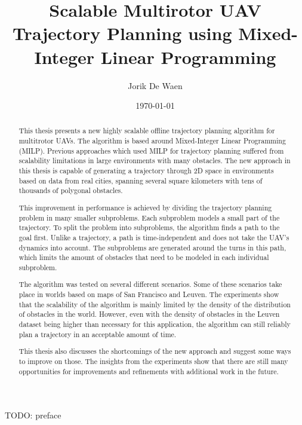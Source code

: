 \documentclass[
master=cws,
masteroption=ai,
english,
]{kulemt}
\title{Scalable Multirotor UAV Trajectory Planning using Mixed-Integer Linear Programming}
\author{Jorik De Waen}
\date{\today}
\begin{document}
\begin{preface}
TODO: preface
\end{preface}

\tableofcontents*

\begin{abstract}
This thesis presents a new highly scalable offline trajectory planning algorithm for multitrotor UAVs. The algorithm is based around Mixed-Integer Linear Programming (MILP). Previous approaches which used MILP for trajectory planning suffered from scalability limitations in large environments with many obstacles. The new approach in this thesis is capable of generating a trajectory through 2D space in environments based on data from real cities, spanning several square kilometers with tens of thousands of polygonal obstacles.
\par
This improvement in performance is achieved by dividing the trajectory planning problem in many smaller subproblems. Each subproblem models a small part of the trajectory. To split the problem into subproblems, the algorithm finds a path to the goal first. Unlike a trajectory, a path is time-independent and does not take the UAV's dynamics into account. The subproblems are generated around the turns in this path, which limits the amount of obstacles that need to be modeled in each individual subproblem.
\par
The algorithm was tested on several different scenarios. Some of these scenarios take place in worlds based on maps of San Francisco and Leuven. The experiments show that the scalability of the algorithm is mainly limited by the density of the distribution of obstacles in the world. However, even with the density of obstacles in the Leuven dataset being higher than necessary for this application, the algorithm can still reliably plan a trajectory in an acceptable amount of time. 
\par
This thesis also discusses the shortcomings of the new approach and suggest some ways to improve on those. The insights from the experiments show that there are still many opportunities for improvements and refinements with additional work in the future.
\end{abstract}
\end{document}

